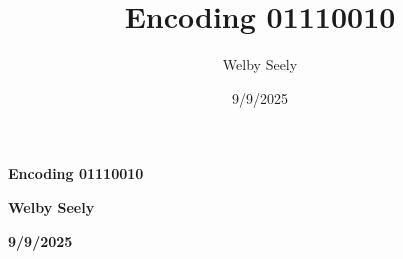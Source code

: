 \documentclass{article}
\title{Encoding 01110010}
\author{Welby Seely}
\date{9/9/2025}
\begin{document}

    \begin{titlepage}
        \centering
        \vspace*{\fill}   %
        {\LARGE \bfseries Encoding 01110010 \par}
        \vspace{1em}
        {\LARGE \bfseries Welby Seely \par}
        \vspace{1em}
        {\LARGE \bfseries 9/9/2025 \par}
        \vspace*{\fill}
    \end{titlepage}

\end{document}

